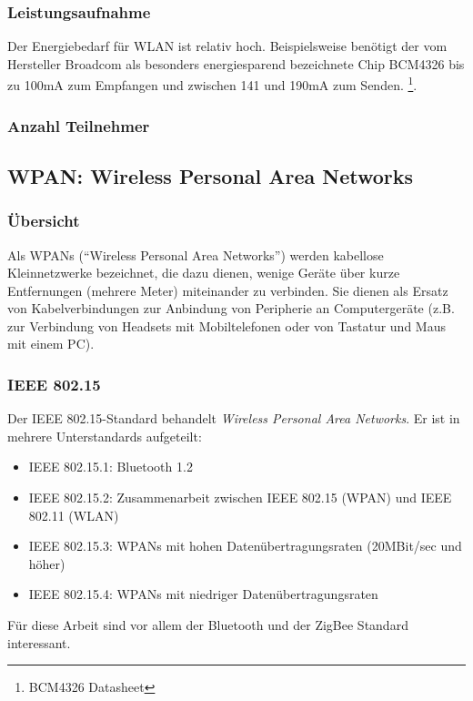 \subsubsection{Leistungsaufnahme}
Der Energiebedarf für WLAN ist relativ hoch. Beispielsweise benötigt der
vom Hersteller Broadcom als besonders energiesparend bezeichnete Chip
BCM4326 bis zu 100mA zum Empfangen und zwischen 141 und 190mA zum Senden.
\footnote{BCM4326 Datasheet}. 

\subsubsection{Anzahl Teilnehmer}

\subsection{WPAN: Wireless Personal Area Networks}
    \subsubsection{Übersicht}
        Als WPANs ("`Wireless Personal Area Networks"') werden kabellose Kleinnetzwerke bezeichnet, die dazu dienen,
        wenige Geräte über kurze Entfernungen (mehrere Meter) miteinander zu verbinden. Sie dienen als Ersatz 
        von Kabelverbindungen zur Anbindung von Peripherie an Computergeräte (z.B. zur Verbindung von
        Headsets mit Mobiltelefonen oder von Tastatur und Maus mit einem PC).
        

    \subsubsection{IEEE 802.15}
        Der IEEE 802.15-Standard behandelt \textsl{Wireless Personal Area Networks}. Er ist in mehrere Unterstandards
        aufgeteilt:

         \begin{itemize}
            \item{IEEE 802.15.1:} Bluetooth 1.2
            \item{IEEE 802.15.2:} Zusammenarbeit zwischen IEEE 802.15 (WPAN) und IEEE 802.11 (WLAN)
            \item{IEEE 802.15.3:} WPANs mit hohen Datenübertragungsraten (20MBit/sec und höher)
            \item{IEEE 802.15.4:} WPANs mit niedriger Datenübertragungsraten
        \end{itemize}

        Für diese Arbeit sind vor allem der Bluetooth und der ZigBee Standard interessant. 

